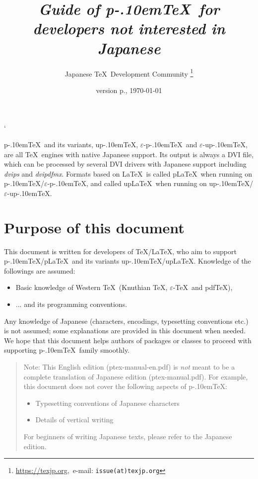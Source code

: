 \documentclass[a4paper,11pt]{article}
\def\epTeX{$\varepsilon$-\pTeX}\def\eTeX{$\varepsilon$-\TeX}
\def\eupTeX{$\varepsilon$-\upTeX}\def\upTeX{u\pTeX}
\def\pTeX{p\kern-.10em\TeX}
\def\pLaTeX{p\LaTeX}\def\upLaTeX{u\pLaTeX}
\def\pdfTeX{pdf\TeX}
\begin{document}
\catcode`
\title{\emph{Guide of \pTeX\ for developers not interested in Japanese}}
\author{Japanese \TeX\ Development Community\null
\thanks{\url{https://texjp.org},\ e-mail: \texttt{issue(at)texjp.org}}}
\date{version p\the\ptexversion.\the\ptexminorversion\ptexrevision, \today}
\maketitle

\pTeX\ and its variants, \upTeX, \epTeX\ and \eupTeX, are all \TeX\ engines
with native Japanese support.
Its output is always a DVI file, which can be processed by several
DVI drivers with Japanese support including {\em dvips} and {\em dvipdfmx}.
Formats based on \LaTeX\ is called \pLaTeX\ when running on \pTeX/\epTeX,
and called \upLaTeX\ when running on \upTeX/\eupTeX.

\section*{Purpose of this document}

This document is written for developers of \TeX/\LaTeX, who aim to
support \pTeX/\pLaTeX\ and its variants \upTeX/\upLaTeX.
Knowledge of the followings are assumed:
\begin{itemize}
  \item Basic knowledge of Western \TeX\ (Knuthian \TeX, \eTeX\ and \pdfTeX),
  \item ... and its programming conventions.
\end{itemize}

Any knowledge of Japanese (characters, encodings, typesetting conventions etc.)
is not assumed; some explanations are provided in this document when needed.
We hope that this document helps authors of packages or classes
to proceed with supporting \pTeX\ family smoothly.

\begin{quotation}
Note: This English edition (ptex-manual-en.pdf) is {\em not} meant
to be a complete translation of Japanese edition (ptex-manual.pdf).
For example, this document does not cover the following aspects of \pTeX:
\begin{itemize}
  \item Typesetting conventions of Japanese characters
  \item Details of vertical writing
\end{itemize}
For beginners of writing Japanese texts,
please refer to the Japanese edition.
\end{quotation}
\end{document}
